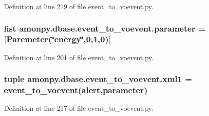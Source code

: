 Definition at line 219 of file event\-\_\-to\-\_\-voevent.\-py.

\hypertarget{namespaceamonpy_1_1dbase_1_1event__to__voevent_aa8180682dfe74a764c3804656183d081}{
\subsubsection[{parameter}]{\setlength{\rightskip}{0pt plus 5cm}list amonpy.\-dbase.\-event\-\_\-to\-\_\-voevent.\-parameter = \mbox{[}Paremeter(\char`\"{}energy\char`\"{},0,1,0)\mbox{]}}}\label{namespaceamonpy_1_1dbase_1_1event__to__voevent_aa8180682dfe74a764c3804656183d081}


Definition at line 201 of file event\-\_\-to\-\_\-voevent.\-py.

\hypertarget{namespaceamonpy_1_1dbase_1_1event__to__voevent_ac83aa72b938b72eeadd9492ef63e72e2}{
\subsubsection[{xml1}]{\setlength{\rightskip}{0pt plus 5cm}tuple amonpy.\-dbase.\-event\-\_\-to\-\_\-voevent.\-xml1 = {\bf event\-\_\-to\-\_\-voevent}({\bf alert},{\bf parameter})}}\label{namespaceamonpy_1_1dbase_1_1event__to__voevent_ac83aa72b938b72eeadd9492ef63e72e2}


Definition at line 217 of file event\-\_\-to\-\_\-voevent.\-py.

